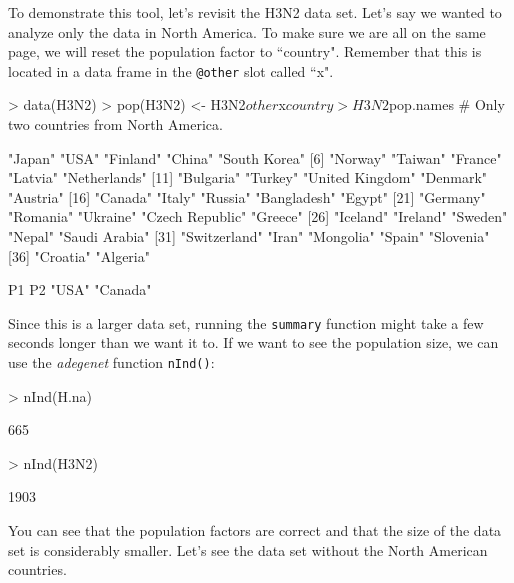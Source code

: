 \documentclass[letterpaper]{article}
\begin{document}
To demonstrate this tool, let's revisit the H3N2 data set. Let's say we wanted to analyze only the data in North America. To make sure we are all on the same page, we will reset the population factor to ``country". Remember that this is located in a data frame in the \texttt{@other} slot called ``x".
\begin{Schunk}
\begin{Sinput}
> data(H3N2)
> pop(H3N2) <- H3N2$other$x$country
> H3N2$pop.names # Only two countries from North America.
\end{Sinput}
\begin{Soutput}
 [1] "Japan"          "USA"            "Finland"        "China"          "South Korea"   
 [6] "Norway"         "Taiwan"         "France"         "Latvia"         "Netherlands"   
[11] "Bulgaria"       "Turkey"         "United Kingdom" "Denmark"        "Austria"       
[16] "Canada"         "Italy"          "Russia"         "Bangladesh"     "Egypt"         
[21] "Germany"        "Romania"        "Ukraine"        "Czech Republic" "Greece"        
[26] "Iceland"        "Ireland"        "Sweden"         "Nepal"          "Saudi Arabia"  
[31] "Switzerland"    "Iran"           "Mongolia"       "Spain"          "Slovenia"      
[36] "Croatia"        "Algeria"       
\end{Soutput}
\begin{Soutput}
      P1       P2 
   "USA" "Canada" 
\end{Soutput}
\end{Schunk}
Since this is a larger data set, running the \texttt{summary} function might take a few seconds longer than we want it to. If we want to see the population size, we can use the \textit{adegenet} function \texttt{nInd()}:
\begin{Schunk}
\begin{Sinput}
> nInd(H.na)
\end{Sinput}
\begin{Soutput}
[1] 665
\end{Soutput}
\begin{Sinput}
> nInd(H3N2)
\end{Sinput}
\begin{Soutput}
[1] 1903
\end{Soutput}
\end{Schunk}
You can see that the population factors are correct and that the size of the data set is considerably smaller. Let's see the data set without the North American countries.
\end{document}
